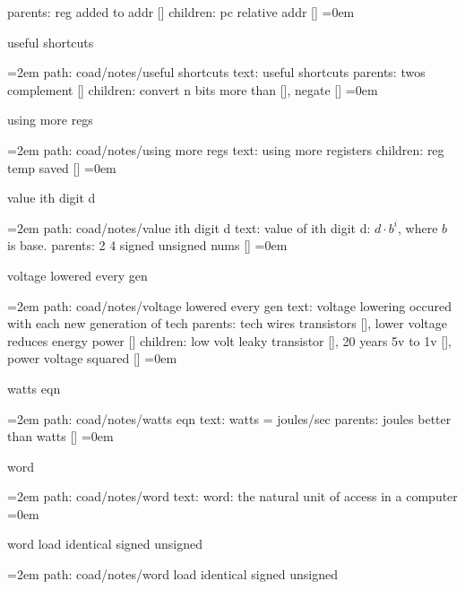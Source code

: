parents:  reg added to addr []
\smallskip
children: pc relative addr []
\smallskip
\leftskip=0em
\par\endgroup
\bigskip
{}
useful shortcuts
\smallskip
\par\begingroup
\leftskip=2em
path: coad/notes/useful shortcuts
\smallskip
text:  useful shortcuts
\smallskip
parents:  twos complement []
\smallskip
children: convert n bits more than [], negate []
\smallskip
\leftskip=0em
\par\endgroup
\bigskip
{}
using more regs
\smallskip
\par\begingroup
\leftskip=2em
path: coad/notes/using more regs
\smallskip
text:  using more registers
\smallskip
children: reg temp saved []
\smallskip
\leftskip=0em
\par\endgroup
\bigskip
{}
value ith digit d
\smallskip
\par\begingroup
\leftskip=2em
path: coad/notes/value ith digit d
\smallskip
text:  value of ith digit d: $d \cdot b^i$, where $b$ is base.
\smallskip
parents:  2 4 signed unsigned nums []
\smallskip
\leftskip=0em
\par\endgroup
\bigskip
{}
voltage lowered every gen
\smallskip
\par\begingroup
\leftskip=2em
path: coad/notes/voltage lowered every gen
\smallskip
text:  voltage lowering occured with each new generation of tech
\smallskip
parents:  tech wires transistors [], lower voltage reduces energy power []
\smallskip
children: low volt leaky transistor [], 20 years 5v to 1v [], power voltage squared []
\smallskip
\leftskip=0em
\par\endgroup
\bigskip
{}
watts eqn
\smallskip
\par\begingroup
\leftskip=2em
path: coad/notes/watts eqn
\smallskip
text:  watts = joules/sec
\smallskip
parents:  joules better than watts []
\smallskip
\leftskip=0em
\par\endgroup
\bigskip
{}
word
\smallskip
\par\begingroup
\leftskip=2em
path: coad/notes/word
\smallskip
text:  word: the natural unit of access in a computer
\smallskip
\leftskip=0em
\par\endgroup
\bigskip
{}
word load identical signed unsigned
\smallskip
\par\begingroup
\leftskip=2em
path: coad/notes/word load identical signed unsigned
